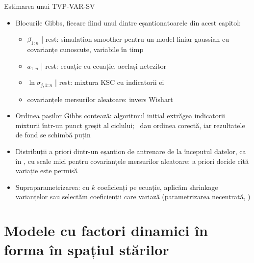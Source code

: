 \begin{frame}{Estimarea unui TVP-VAR-SV}
\itemsize{\small}
\begin{itemize}
    \item Blocurile Gibbs, fiecare fiind unul dintre eșantionatoarele din acest capitol:
    \begin{itemize}
        \item $\beta_{1:n}$ | rest: simulation smoother pentru un model liniar gaussian cu covarianțe cunoscute, variabile în timp
        \item $a_{1:n}$ | rest: ecuație cu ecuație, același netezitor
        \item $\ln\sigma_{j,1:n}$ | rest: mixtura KSC cu indicatorii ei
        \item covarianțele mersurilor aleatoare: invers Wishart
    \end{itemize}
    \item Ordinea pașilor Gibbs contează: algoritmul inițial extrăgea indicatorii mixturii într-un punct greșit al ciclului; \ dau ordinea corectă, iar rezultatele de fond se schimbă puțin
    \item Distribuții a priori dintr-un eșantion de antrenare de la începutul datelor, ca în , cu scale mici pentru covarianțele mersurilor aleatoare: a priori decide cîtă variație este permisă
    \item Supraparametrizarea: cu $k$ coeficienți pe ecuație, aplicăm shrinkage varianțelor sau selectăm coeficienții care variază (parametrizarea necentrată, )
\end{itemize}
\end{frame}


\section{Modele cu factori dinamici în forma în spațiul stărilor}

